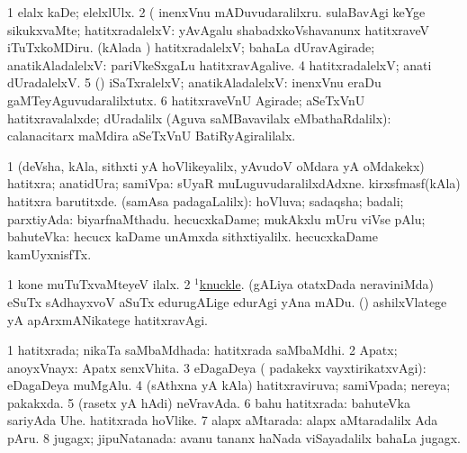 \noindent
\gl{\pagu}
\bmng
\bnum
\num{1}  elalx kaDe; elelxlUlx. 
\num{2}  (    inenxVnu mADuvudaralilxru. 
  
\banum
{} sulaBavAgi keYge sikukxvaMte; hatitxradalelxV:  yAvAgalu shabadxkoVshavanunx hatitxraveV iTuTxkoMDiru. 
 (kAlada \vi) hatitxradalelxV; bahaLa dUravAgirade; anatikAladalelxV:  pariVkeSxgaLu hatitxravAgalive. 
\eanum
\numie
\num{4}  hatitxradalelxV; anati dUradalelxV. 
\num{5}  (\pArxparx) iSaTxralelxV; anatikAladalelxV:  inenxVnu eraDu gaMTeyAguvudaralilxtutx. 
\num{6}  hatitxraveVnU Agirade; aSeTxVnU hatitxravalalxde; dUradalilx (Aguva saMBavavilalx eMbathaRdalilx):  calanacitarx maMdira aSeTxVnU BatiRyAgiralilalx. 
\enum
\emng
\eentry

\bentry
{}
\gl{\upa}
\bmng
\bnum
\num{1} (deVsha, kAla, sithxti yA hoVlikeyalilx, yAvudoV oMdara yA oMdakekx) hatitxra; anatidUra; samiVpa:  sUyaR muLuguvudaralilxdAdxne.  kirxsfmasf(kAla) hatitxra barutitxde. 
 (samAsa padagaLalilx): 
\banum
{} hoVluva; sadaqsha; badali; parxtiyAda:  biyarfnaMthadu. 
 hecucxkaDame; mukAkxlu mUru viVse pAlu; bahuteVka:  hecucx kaDame unAmxda sithxtiyalilx.  hecucxkaDame kamUyxnisfTx. 
\eanum
\numie
\enum
\emng

\noindent
\gl{\pagu}
\bmng
\bnum
\num{1}  kone muTuTxvaMteyeV ilalx. 
\num{2}  \hyperref{kandict_k.pdf}{K}{knuckle(1) nuga(2)}{$^1$knuckle}. 
  
\banum
{} (gALiya otatxDada neraviniMda) eSuTx sAdhayxvoV aSuTx edurugALige edurAgi yAna mADu. 
 (\AmA) ashilxVlatege yA apArxmANikatege hatitxravAgi. 
\eanum
\numie
\enum
\emng
\eentry

\bentry
{}
\gl{\gu}
\bmng
\bnum
\num{1} hatitxrada; nikaTa saMbaMdhada:  hatitxrada saMbaMdhi. 
\num{2} Apatx; anoyxVnayx:  Apatx senxVhita. 
\num{3} eDagaDeya ( padakekx vayxtirikatxvAgi):  eDagaDeya muMgAlu. 
\num{4} (sAthxna yA kAla) hatitxraviruva; samiVpada; nereya; pakakxda. 
\num{5} (rasetx yA hAdi) neVravAda. 
\num{6} bahu hatitxrada:  bahuteVka sariyAda Uhe.  hatitxrada hoVlike. 
\num{7} alapx aMtarada:  alapx aMtaradalilx Ada pAru. 
\num{8} jugagx; jipuNatanada:  avanu tananx haNada viSayadalilx bahaLa jugagx. 
\enum
\emng

